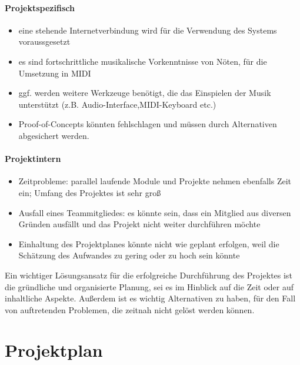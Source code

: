 \documentclass[12pt]{scrartcl}
\begin{document}
\paragraph{Projektspezifisch}
\begin{itemize}
\item eine stehende Internetverbindung wird für die Verwendung des Systems voraussgesetzt
\item es sind fortschrittliche musikalische Vorkenntnisse von Nöten, für die Umsetzung in MIDI
\item ggf. werden weitere Werkzeuge benötigt, die das Einspielen der Musik unterstützt (z.B. Audio-Interface,MIDI-Keyboard etc.)
\item Proof-of-Concepts könnten fehlschlagen und müssen durch Alternativen abgesichert werden.
\end{itemize}


\paragraph{Projektintern}
\begin{itemize}
\item Zeitprobleme: parallel laufende Module und Projekte nehmen ebenfalls Zeit ein; Umfang des Projektes ist sehr groß 
\item Ausfall eines Teammitgliedes: es könnte sein, dass ein Mitglied aus diversen Gründen ausfällt und das Projekt nicht weiter durchführen möchte
\item Einhaltung des Projektplanes könnte nicht wie geplant erfolgen, weil die Schätzung des Aufwandes zu gering oder zu hoch sein könnte
\end{itemize}


Ein wichtiger Lösungsansatz für die erfolgreiche Durchführung des Projektes ist die gründliche und organisierte Planung, sei es im Hinblick auf die Zeit oder auf inhaltliche Aspekte.  Außerdem ist es wichtig Alternativen zu haben, für den Fall von auftretenden Problemen, die zeitnah nicht gelöst werden können.


\section{Projektplan}



\end{document}
